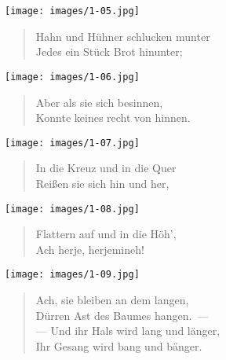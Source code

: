 \documentclass[a4paper,12pt]{article}
\begin{document}
\begin{center}\texttt{[image: images/1-05.jpg]}\end{center}



\begin{verse}
Hahn und Hühner schlucken munter\\{}
Jedes ein Stück Brot hinunter;
\end{verse}



\begin{center}\texttt{[image: images/1-06.jpg]}\end{center}



\begin{verse}
Aber als sie sich besinnen,\\{}
Konnte keines recht von hinnen.
\end{verse}



\begin{center}\texttt{[image: images/1-07.jpg]}\end{center}



\begin{verse}
In die Kreuz und in die Quer\\{}
Reißen sie sich hin und her,
\end{verse}



\begin{center}\texttt{[image: images/1-08.jpg]}\end{center}



\begin{verse}
Flattern auf und in die Höh',\\{}
Ach herje, herjemineh!
\end{verse}



\begin{center}\texttt{[image: images/1-09.jpg]}\end{center}



\begin{verse}
Ach, sie bleiben an dem langen,\\{}
Dürren Ast des Baumes hangen.~—\\{}
— Und ihr Hals wird lang und länger,\\{}
Ihr Gesang wird bang und bänger.
\end{verse}
\end{document}
